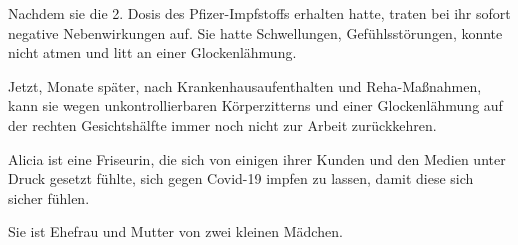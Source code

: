 Nachdem sie die 2. Dosis des Pfizer-Impfstoffs erhalten hatte, traten bei ihr
sofort negative Nebenwirkungen auf. Sie hatte Schwellungen, Gefühlsstörungen,
konnte nicht atmen und litt an einer Glockenlähmung.

Jetzt, Monate später, nach Krankenhausaufenthalten und Reha-Maßnahmen, kann sie
wegen unkontrollierbaren Körperzitterns und einer Glockenlähmung auf der rechten
Gesichtshälfte immer noch nicht zur Arbeit zurückkehren.

Alicia ist eine Friseurin, die sich von einigen ihrer Kunden und den Medien
unter Druck gesetzt fühlte, sich gegen Covid-19 impfen zu lassen, damit diese
sich sicher fühlen.

Sie ist Ehefrau und Mutter von zwei kleinen Mädchen.
